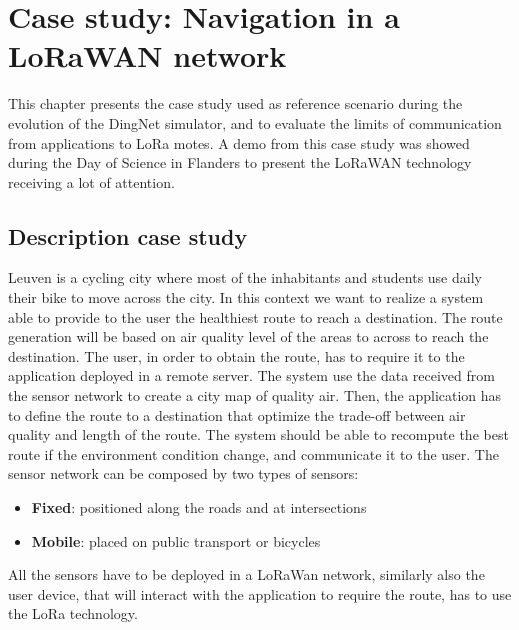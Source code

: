 \chapter{Case study: Navigation in a LoRaWAN network}
\label{chap:case-staudyLoRa}

This chapter presents the case study used as reference scenario during the evolution of the DingNet simulator, and to evaluate the limits of communication from applications to LoRa motes. 
A demo from this case study was showed during the Day of Science in Flanders to present the LoRaWAN technology receiving a lot of attention.

\section{Description case study}
Leuven is a cycling city where most of the inhabitants and students use daily their bike to move across the city. 
In this context we want to realize a system able to provide to the user the healthiest route to reach a destination. 
The route generation will be based on air quality level of the areas to across to reach the destination. 
The user, in order to obtain the route, has to require it to the application deployed in a remote server.
The system use the data received from the sensor network to create a city map of quality air.
Then, the application has to define the route to a destination that optimize the trade-off between air quality and length of the route.
The system should be able to recompute the best route if the environment condition change, and communicate it to the user.
The sensor network can be composed by two types of sensors:
\begin{itemize}
    \item \textbf{Fixed}: positioned along the roads and at intersections
    \item \textbf{Mobile}: placed on public transport or bicycles
\end{itemize}
All the sensors have to be deployed in a LoRaWan network, similarly also the user device, that will interact with the application to require the route, has to use the LoRa technology.

